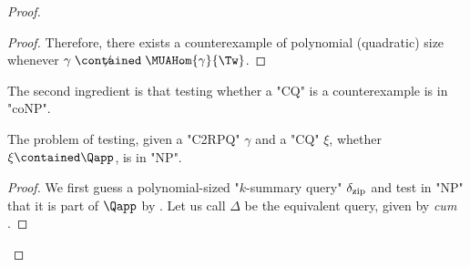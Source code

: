 \begin{proof}
\begin{proof}
	Therefore, there exists a counterexample of polynomial (quadratic) size whenever $\gamma \centernot{\contained} \MUAHom{\gamma}{\Tw}$.
  \end{proof}
  The second ingredient is that testing whether a "CQ" is a counterexample is in "coNP".

  \begin{claim}\AP\label{claim:cq-in-Qapp-np}
    The problem of testing, given a "C2RPQ" $\gamma$ and a "CQ" $\xi$, whether $\xi \contained \Qapp$, is in "NP".
  \end{claim}
  \begin{proof}
        We first guess a polynomial-sized "$k$-summary query" $\delta_{\textup{zip}}$ and test in "NP" that it is part of $\Qapp$ by . 
        Let us call $\Delta$ be the equivalent {\UCRPQSRE} query, given by  \textit{cum} .

\end{proof}
\end{proof}
